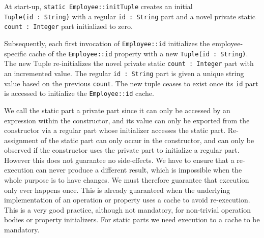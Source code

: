 \documentclass[sigconf]{acmart}
\begin{document}
At start-up, \verb|static Employee::initTuple| creates an initial\\
\verb|Tuple(id : String)| with a regular \verb|id : String| part and a novel private static \verb|count : Integer| part initialized to zero.

Subsequently, each first invocation of \verb|Employee::id| initializes the employee-specific cache of the \verb|Employee::id| property with a new
\verb|Tuple(id : String)|. The new Tuple re-initializes the novel private static \verb|count : Integer| part with an incremented value. The regular \verb|id : String| part is given a unique string value based on the previous \verb|count|. The new tuple ceases to exist once its \verb|id| part is accessed to initialize the \verb|Employee::id| cache.
 
 We call the static part a private part since it can only be accessed by an expression within the constructor, and its value can only be exported from the constructor via a regular part whose initializer accesses the static part. Re-assignment of the static part can only occur in the constructor, and can only be observed if the constructor uses the private part to initialize a regular part. However this does not guarantee no side-effects. We have to ensure that a re-execution can never produce a different result, which is impossible when the whole purpose is to have changes. We must therefore guarantee that execution only ever happens once. This is already guaranteed when the underlying implementation of an operation or property uses a cache to avoid re-execution. This is a very good practice, although not mandatory, for non-trivial operation bodies or property initializers. For static parts we need execution to a cache to be mandatory.
 
 
 
 
  

\end{document}
